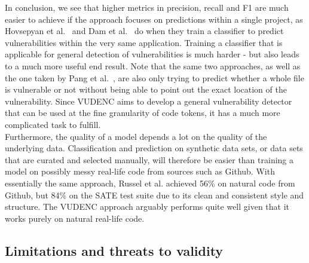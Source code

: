 \documentclass[
a4paper,
pagesize,
pdftex,
12pt,
twoside, %
BCOR=5mm, %
ngerman,
fleqn,
final,
]{scrartcl}
\begin{document}
	In conclusion, we see that higher metrics in precision, recall and F1 are much easier to achieve if the approach focuses on predictions within a single project, as Hovsepyan et al.~\cite{Hovsepyan.2012} and Dam et al.~\cite{Dam.2017} do when they train a classifier to predict vulnerabilities within the very same application. Training a classifier that is applicable for general detection of vulnerabilities is much harder - but also leads to a much more useful end result. Note that the same two approaches, as well as the one taken by Pang et al.~\cite{Pang.2015}, are also only trying to predict whether a whole file is vulnerable or not without being able to point out the exact location of the vulnerability. Since VUDENC aims to develop a general vulnerability detector that can be used at the fine granularity of code tokens, it has a much more complicated task to fulfill.\\	
	Furthermore, the quality of a model depends a lot on the quality of the underlying data. Classification and prediction on synthetic data sets, or data sets that are curated and selected manually, will therefore be easier than training a model on possibly messy real-life code from sources such as Github. With essentially the same approach, Russel et al. achieved 56\% on natural code from Github, but 84\% on the SATE test suite due to its clean and consistent style and structure. The VUDENC approach arguably performs quite well given that it works purely on natural real-life code. 
	
	
	\subsection{Limitations and threats to validity}
	
\end{document}
